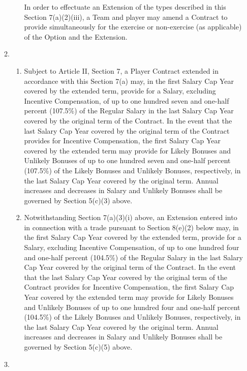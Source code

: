 \documentclass[
]{book}
\providecommand{\tightlist}{%
  \setlength{\itemsep}{0pt}\setlength{\parskip}{0pt}}
\begin{document}
\begin{enumerate}
\begin{enumerate}
\begin{enumerate}
      In order to effectuate an Extension of the types described in this Section 7(a)(2)(iii), a Team and player may amend a Contract to provide simultaneously for the exercise or non-exercise (as applicable) of the Option and the Extension.
    \end{enumerate}
  \item
    \begin{enumerate}
    \def\labelenumiii{(\roman{enumiii})}
    \tightlist
    \item
      Subject to Article II, Section 7, a Player Contract extended in accordance with this Section 7(a) may, in the first Salary Cap Year covered by the extended term, provide for a Salary, excluding Incentive Compensation, of up to one hundred seven and one-half percent (107.5\%) of the Regular Salary in the last Salary Cap Year covered by the original term of the Contract. In the event that the last Salary Cap Year covered by the original term of the Contract provides for Incentive Compensation, the first Salary Cap Year covered by the extended term may provide for Likely Bonuses and Unlikely Bonuses of up to one hundred seven and one-half percent (107.5\%) of the Likely Bonuses and Unlikely Bonuses, respectively, in the last Salary Cap Year covered by the original term. Annual increases and decreases in Salary and Unlikely Bonuses shall be governed by Section 5(c)(3) above.
    \item
      Notwithstanding Section 7(a)(3)(i) above, an Extension entered into in connection with a trade pursuant to Section 8(e)(2) below may, in the first Salary Cap Year covered by the extended term, provide for a Salary, excluding Incentive Compensation, of up to one hundred four and one-half percent (104.5\%) of the Regular Salary in the last Salary Cap Year covered by the original term of the Contract. In the event that the last Salary Cap Year covered by the original term of the Contract provides for Incentive Compensation, the first Salary Cap Year covered by the extended term may provide for Likely Bonuses and Unlikely Bonuses of up to one hundred four and one-half percent (104.5\%) of the Likely Bonuses and Unlikely Bonuses, respectively, in the last Salary Cap Year covered by the original term. Annual increases and decreases in Salary and Unlikely Bonuses shall be governed by Section 5(c)(5) above.
    \end{enumerate}
  \item

\end{enumerate}
\end{enumerate}
\end{document}
